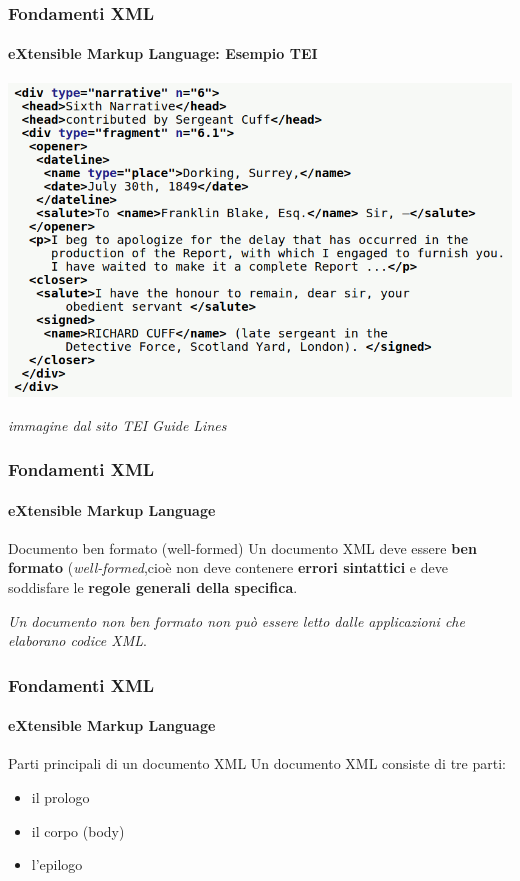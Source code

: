 \begin{frame}
	\frametitle{Fondamenti XML}
	\framesubtitle{eXtensible Markup Language: Esempio TEI}
	\addtocounter{nframe}{1}

	\begin{center}
		\includegraphics[width=.9\textwidth]{imgs/xml-TEI-Example.png}
	\end{center}

	\begin{tiny}
        \textit{immagine dal sito TEI Guide Lines}
    \end{tiny}

\end{frame}


\begin{frame}
	\frametitle{Fondamenti XML}
	\framesubtitle{eXtensible Markup Language}
	\addtocounter{nframe}{1}

	\begin{block}{Documento ben formato (well-formed)}
		Un documento XML deve essere \textbf{ben formato} (\textit{well-formed},cioè non deve contenere \textbf{errori sintattici} e deve soddisfare le \textbf{regole generali della specifica}.
	\end{block}
	\textit{Un documento non ben formato non può essere letto dalle applicazioni che elaborano codice XML}.

\end{frame}


\begin{frame}
	\frametitle{Fondamenti XML}
	\framesubtitle{eXtensible Markup Language}
	\addtocounter{nframe}{1}

	\begin{block}{Parti principali di un documento XML}
		Un documento XML consiste di tre parti:
		\begin{itemize}
			\item il prologo
			\item il corpo (body)
			\item l'epilogo
		\end{itemize}
	\end{block}

\end{frame}


